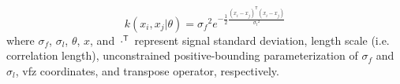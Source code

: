\begin{equation} \label{eq:squared-exponential}
	k(x_i,x_j|\theta )=\sigma _f{}^2 e^{-\frac{1}{2}\frac{\left(x_i-x_j\right)^\mathsf{T}\left(x_i-x_j\right)}{\sigma _l{}^2}}
\end{equation}
where $\sigma _f$, $\sigma _l$, $\theta$, $x$, and $\cdot ^{\mathsf{T}}$ represent signal standard deviation, length scale (i.e. correlation length), unconstrained positive-bounding parameterization of $\sigma _f$ and $\sigma _l$, \gls{vfz} coordinates, and transpose operator, respectively.